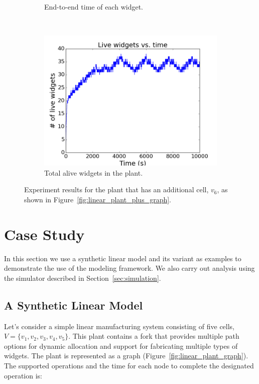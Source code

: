 \begin{figure}[!t]
\begin{subfigure}[t]{0.33\linewidth}
\caption{End-to-end time of each widget.}
\label{fig:linear_plus_end_to_end}
    \end{subfigure}%
        ~ 
    \begin{subfigure}[t]{0.33\linewidth}
        \centering     
 \includegraphics[width=0.99\columnwidth]{Figures/b3-total-widgets}
\caption{Total alive widgets in the plant.}
\label{fig:linear_plus_total_widgets}
    \end{subfigure}
    \caption{Experiment results for the plant that has an additional cell, $v_6$, as shown in Figure~\ref{fig:linear_plant_plus_graph}.}
    \label{fig:linear_plus_exp}
\end{figure}

\section{Case Study}
\label{sec:case_study}
In this section we use a synthetic linear model and its variant as examples to demonstrate the use of the \mfname modeling framework.
We also carry out analysis using the simulator described in Section~\ref{sec:simulation}.

\subsection{A Synthetic Linear Model}
\label{subsec:linear_model}
Let's consider a simple linear manufacturing system consisting of five cells, $V=\{v_1,v_2,v_3,v_4,v_5\}$.
This plant contains a fork that provides multiple path options for dynamic allocation and support for fabricating multiple types of widgets.
The plant is represented as a graph (Figure~\ref{fig:linear_plant_graph}).
The supported operations and the time for each node to complete the designated operation is:\\

